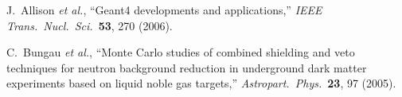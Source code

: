 \documentclass[12pt]{article}
\begin{document}
\begin{thebibliography}{99}
  J.~Allison {\it et al.},
  ``Geant4 developments and applications,''
  \textit{IEEE Trans.\ Nucl.\ Sci.}\  {\bf 53}, 270 (2006).
 
 
 
  C.~Bungau {\it et al.},
  ``Monte Carlo studies of combined shielding and veto techniques for neutron background reduction in underground dark matter experiments based on liquid noble gas targets,''
  \textit{Astropart.\ Phys.}\  {\bf 23}, 97 (2005).
 
 
 \end{thebibliography}
\end{document}
